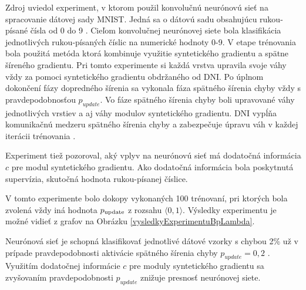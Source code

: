 Zdroj \cite{Jaderberg2016} uviedol experiment, v ktorom použil konvolučnú neurónovú sieť na spracovanie dátovej sady MNIST. Jedná sa o dátovú sadu obsahujúcu rukou-písané čísla od 0 do 9 \cite{yann1998mnist}. Cieľom konvolučnej neurónovej siete bola klasifikácia jednotlivých rukou-písaných číslic na numerické hodnoty 0-9. V etape trénovania bola použitá metóda ktorá kombinuje využitie syntetického gradientu a spätne šíreného gradientu. Pri tomto experimente si každá vrstva upravila svoje váhy vždy za pomoci syntetického gradientu obdržaného od DNI. Po úplnom dokončení fázy dopredného šírenia sa vykonala fáza spätného šírenia chyby vždy s pravdepodobnosťou $p_{update}$. Vo fáze spätného šírenia chyby boli upravované váhy jednotlivých vrstiev a aj váhy modulov syntetického gradientu. DNI vypĺňa komunikačnú medzeru spätného šírenia chyby a zabezpečuje úpravu váh v každej iterácii trénovania \cite{Jaderberg2016}.

Experiment tiež pozoroval, aký vplyv na neurónovú sieť má dodatočná informácia $c$ pre modul syntetického gradientu. Ako dodatočná informácia bola poskytnutá supervízia, skutočná hodnota rukou-písanej číslice.

V tomto experimente bolo dokopy vykonaných 100 trénovaní, pri ktorých bola zvolená vždy iná hodnota $p\textsubscript{update}$ z rozsahu $\langle 0, 1\rangle$. Výsledky experimentu je možné vidieť z grafov na Obrázku \ref{vysledkyExperimentuBpLambda}. 

Neurónová sieť je schopná klasifikovať jednotlivé dátové vzorky s chybou 2\% už v prípade pravdepodobnosti aktivácie spätného šírenia chyby $p_{update}=0,2$ \cite{Jaderberg2016}. Využitím dodatočnej informácie $c$ pre moduly syntetického gradientu sa zvyšovaním pravdepodobnosti $p_{update}$ znižuje presnosť neurónovej siete.


